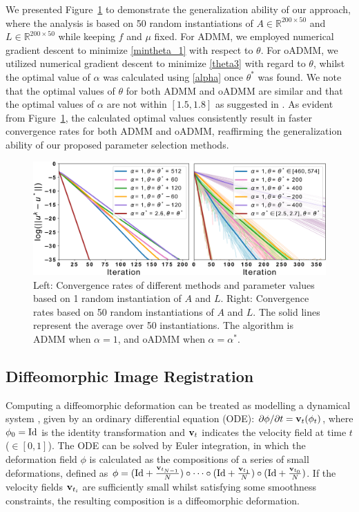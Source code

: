 \documentclass[letterpaper]{article} %
\begin{document}
We presented Figure~\ref{fig:c} to demonstrate the generalization ability of our approach, where the analysis is based on 50 random instantiations of $A\in\mathbb{R}^{200\times 50}$ and $L\in\mathbb{R}^{200\times 50}$ while keeping $f$ and $\mu$ fixed. For ADMM, we employed numerical gradient descent to minimize \eqref{mintheta_1} with respect to $\theta$. For oADMM, we utilized numerical gradient descent to minimize \eqref{theta3} with regard to $\theta$, whilst the optimal value of $\alpha$ was calculated using \eqref{alpha} once $\theta^*$ was found. We note that the optimal values of $\theta$ for both ADMM and oADMM are similar and that the optimal values of $\alpha$ are not within $[1.5,1.8]$ as suggested in \cite{eckstein1994parallel}. As evident from Figure~\ref{fig:c}, the calculated optimal values consistently result in faster convergence rates for both ADMM and oADMM, reaffirming the generalization ability of our proposed parameter selection methods.

\begin{figure}[h!]
\centering
\includegraphics[width=1\linewidth]{Figures/F2n2.pdf}
\vspace{-17pt}
\caption{Left: Convergence rates of different methods and parameter values based on 1 random instantiation of $A$ and $L$. Right: Convergence rates based on 50 random instantiations of $A$ and $L$. The solid lines represent the average over 50 instantiations. The algorithm is ADMM when $\alpha=1$, and oADMM when $\alpha = \alpha^*$. }
\vspace{-5pt}
\label{fig:c}
\end{figure}

\subsection{Diffeomorphic Image Registration} 
Computing a diffeomorphic deformation can be treated as modelling a dynamical system \cite{beg2005computing}, given by an ordinary differential equation (ODE): $\partial{\bf{\phi}}/\partial t  = {\bf{v}}_t({\bf{\phi}}_t)$, where ${\bf{\phi}}_0 = {\rm{Id}}$ is the identity transformation and ${\bf{v}}_t$ indicates the velocity field at time $t$ ($\in [0,1]$).  The ODE can be solved by Euler integration, in which the deformation field $\phi$ is calculated as the compositions of a series of small deformations, defined as $\phi=({\rm{Id}}+\frac{{\bf{v}}_{t_{N-1}}}{N})
\circ \cdots \circ ({\rm{Id}}+\frac{{\bf{v}}_{t_{1}}}{N})\circ ({\rm{Id}}+\frac{{\bf{v}}_{t_0}}{N})$. If the velocity fields ${\bf{v}}_{t_{i}}$ are sufficiently small whilst satisfying some smoothness constraints, the resulting composition is a diffeomorphic deformation. 
    
\end{document}
